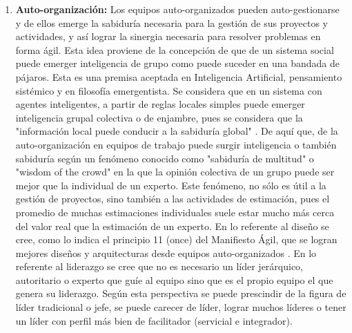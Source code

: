 \begin{enumerate}
\item \textbf{Auto-organización:} Los equipos auto-organizados pueden auto-gestionarse y de ellos emerge la sabiduría necesaria para la gestión de sus proyectos y actividades, y así lograr la sinergia necesaria para resolver problemas en forma ágil. Esta idea proviene de la concepción de que de un sistema social puede emerger inteligencia de grupo como puede suceder en una bandada de pájaros. Esta es una premisa aceptada en Inteligencia Artificial, pensamiento sistémico y en filosofía emergentista. Se considera que en un sistema con agentes inteligentes, a partir de reglas locales simples puede emerger inteligencia grupal colectiva o de enjambre, pues se considera que la "información local puede conducir a la sabiduría global" \cite{Steven-Johnson-2002}. De aquí que, de la auto-organización en equipos de trabajo puede surgir inteligencia o también sabiduría según un fenómeno conocido como "sabiduría de multitud" o "wisdom of the crowd" \cite{MIT-Press-2009} en la que la opinión colectiva de un grupo puede ser mejor que la individual de un experto. Este fenómeno, no sólo es útil a la gestión de proyectos, sino también a las actividades de estimación, pues el promedio de muchas estimaciones individuales suele estar mucho más cerca del valor real que la estimación de un experto. En lo referente al diseño se cree, como lo indica el principio 11 (once) del Manifiesto Ágil, que se logran mejores diseños y arquitecturas desde equipos auto-organizados \cite{UNTREF-2014}. En lo referente al liderazgo se cree que no es necesario un líder jerárquico, autoritario o experto que guíe al equipo sino que es el propio equipo el que genera su liderazgo. Según esta perspectiva se puede prescindir de la figura de líder tradicional o jefe, se puede carecer de líder, lograr muchos líderes o tener un líder con perfil más bien de facilitador (servicial e integrador).


\end{enumerate}
